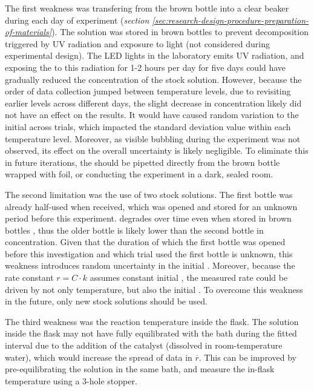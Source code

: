 \documentclass[hyphens]{article}
\begin{document}
The first weakness was transfering  from the brown bottle into a clear beaker during each day of experiment (\textit{section \ref{sec:research-design-procedure-preparation-of-materials}}). The  solution was stored in brown bottles to prevent decomposition triggered by UV radiation and exposure to light (not considered during experimental design). The LED lights in the laboratory emits UV radiation, and exposing the  to this radiation for 1-2 hours per day for five days could have gradually reduced the concentration of the stock solution. However, because the order of data collection jumped between temperature levels, due to revisiting earlier levels across different days, the slight decrease in concentration likely did not have an effect on the results. It would have caused random variation to the initial \ce{[H2O2]} across trials, which impacted the standard deviation value within each temperature level. Moreover, as visible bubbling during the experiment was not observed, its effect on the overall uncertainty is likely negligible. To eliminate this in future iterations, the  should be pipetted directly from the brown bottle wrapped with foil, or conducting the experiment in a dark, sealed room.

The second limitation was the use of two stock  solutions. The first bottle was already half-used when received, which was opened and stored for an unknown period before this experiment.  degrades over time even when stored in brown bottles \cite{ExpirationShelfLife}, thus the older bottle is likely lower than the second bottle in concentration. Given that the duration of which the first bottle was opened before this investigation and which trial used the first bottle is unknown, this weakness introduces random uncertainty in the initial \ce{[H2O2]}. Moreover, because the rate constant $r = C \cdot k$ assumes constant initial \ce{[H2O2]}, the measured rate could be driven by not only temperature, but also the initial \ce{[H2O2]}. To overcome this weakness in the future, only new  stock solutions should be used.


The third weakness was the reaction temperature inside the flask. The solution inside the flask may not have fully equilibrated with the bath during the fitted interval due to the addition of the catalyst (dissolved in room-temperature water), which would increase the spread of data in $\overline{r}$. This can be improved by pre-equilibrating the  solution in the same bath, and measure the in-flask temperature using a 3-hole stopper.
\end{document}
